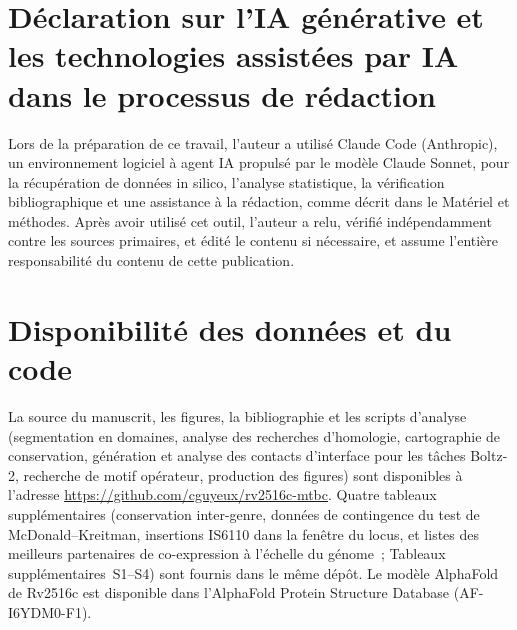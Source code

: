 \documentclass[11pt,a4paper]{article}
\begin{document}
\section*{Déclaration sur l'IA générative et les technologies assistées par IA dans le processus de rédaction}

Lors de la préparation de ce travail, l'auteur a utilisé Claude Code (Anthropic), un environnement
logiciel à agent IA propulsé par le modèle Claude Sonnet, pour la récupération de données in
silico, l'analyse statistique, la vérification bibliographique et une assistance à la rédaction,
comme décrit dans le Matériel et méthodes. Après avoir utilisé cet outil, l'auteur a relu, vérifié
indépendamment contre les sources primaires, et édité le contenu si nécessaire, et assume
l'entière responsabilité du contenu de cette publication.

\section*{Disponibilité des données et du code}

La source du manuscrit, les figures, la bibliographie et les scripts d'analyse (segmentation en
domaines, analyse des recherches d'homologie, cartographie de conservation, génération et analyse
des contacts d'interface pour les tâches Boltz-2, recherche de motif opérateur, production des
figures) sont disponibles à l'adresse \url{https://github.com/cguyeux/rv2516c-mtbc}. Quatre
tableaux supplémentaires (conservation inter-genre, données de contingence du test de
McDonald--Kreitman, insertions IS6110 dans la fenêtre du locus, et listes des meilleurs partenaires
de co-expression à l'échelle du génome~; Tableaux supplémentaires~S1--S4) sont fournis dans le même
dépôt. Le modèle AlphaFold de Rv2516c est disponible dans l'AlphaFold Protein Structure Database
(AF-I6YDM0-F1).



\end{document}
